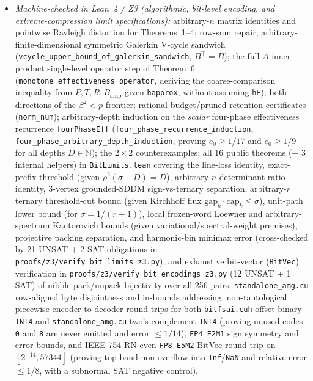 \documentclass[10pt]{article}
\begin{document}
\begin{itemize}
  \item \emph{Machine-checked in Lean~4 / Z3 (algorithmic, bit-level encoding, and extreme-compression limit specifications):} arbitrary-$n$ matrix identities and pointwise Rayleigh distortion for Theorems~1--4; row-sum repair; arbitrary-finite-dimensional symmetric Galerkin V-cycle sandwich (\texttt{vcycle\_upper\_bound\_of\_galerkin\_sandwich}, $B^\top = B$); the full $A$-inner-product single-level operator step of Theorem~6 (\texttt{monotone\_effectiveness\_operator}, deriving the coarse-comparison inequality from $P, T, R, B_{\mathrm{amp}}$ given \texttt{happrox}, without assuming \texttt{hE}); both directions of the $\beta^2 < p$ frontier; rational budget/pruned-retention certificates (\texttt{norm\_num}); arbitrary-depth induction on the \emph{scalar} four-phase effectiveness recurrence \texttt{fourPhaseEff} (\texttt{four\_phase\_recurrence\_induction}, \texttt{four\_phase\_arbitrary\_depth\_induction}, proving $e_0 \ge 1/17$ and $e_0 \ge 1/9$ for all depths $D \in \mathbb{N}$); the $2\times 2$ counterexamples; all 16 public theorems (+ 3 internal helpers) in \texttt{BitLimits.lean} covering the line-loss identity, exact-prefix threshold (given $\rho^2(\sigma+D)=D$), arbitrary-$n$ determinant-ratio identity, 3-vertex grounded-SDDM sign-vs-ternary separation, arbitrary-$r$ ternary threshold-cut bound (given Kirchhoff flux $\mathrm{gap}_k \cdot \mathrm{cap}_k \le \sigma$), unit-path lower bound (for $\sigma = 1/(r+1)$), local frozen-word Loewner and arbitrary-spectrum Kantorovich bounds (given variational/spectral-weight premises), projective packing separation, and harmonic-bin minimax error (cross-checked by 21 UNSAT + 2 SAT obligations in \texttt{proofs/z3/verify\_bit\_limits\_z3.py}); and exhaustive bit-vector (\texttt{BitVec}) verification in \texttt{proofs/z3/verify\_bit\_encodings\_z3.py} (12 UNSAT + 1 SAT) of nibble pack/unpack bijectivity over all 256 pairs, \texttt{standalone\_amg.cu} row-aligned byte disjointness and in-bounds addressing, non-tautological piecewise encoder-to-decoder round-trips for both \texttt{bitfsai.cuh} offset-binary \texttt{INT4} and \texttt{standalone\_amg.cu} two's-complement \texttt{INT4} (proving unused codes \texttt{0} and \texttt{8} are never emitted and error $\le 1/14$), \texttt{FP4 E2M1} sign symmetry and error bounds, and IEEE-754 RN-even \texttt{FP8 E5M2} BitVec round-trip on $[2^{-14}, 57344]$ (proving top-band non-overflow into \texttt{Inf}/\texttt{NaN} and relative error $\le 1/8$, with a subnormal SAT negative control).

\end{itemize}
\end{document}
